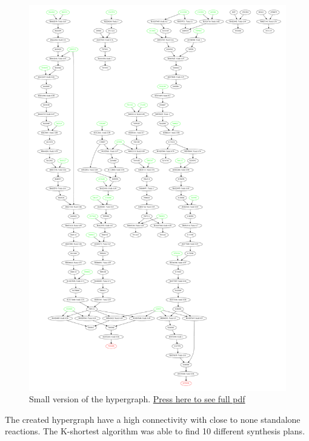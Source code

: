 \documentclass[a4paper,10pt,titlepage]{paper}
\begin{document}
\begin{figure}[H]
\centering
\includegraphics[scale=0.18]{Synteseplaner/Dysidiolide/Output.pdf}
\caption{Small version of the hypergraph. \href{Synteseplaner/Dysidiolide/Output.pdf}{Press here to see full pdf}}
\end{figure}

The created hypergraph have a high connectivity with close to none standalone reactions. The K-shortest algorithm was able to find 10 different synthesis plans.
\end{document}
